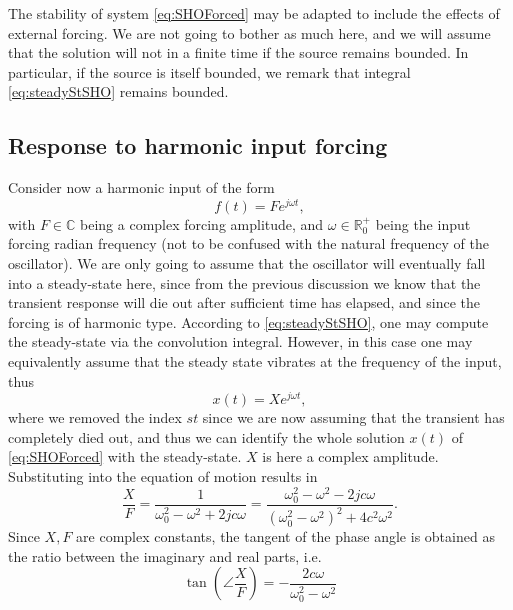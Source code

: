 The stability of system \eqref{eq:SHOForced} may be adapted to include the effects of external forcing. We are not going to bother as much here, and we will assume that the solution will not  in a finite time if the source remains bounded. 
In particular, if the source is itself bounded, we remark that integral \eqref{eq:steadyStSHO} remains bounded. 





\subsection{Response to harmonic input forcing}

Consider now a harmonic input of the form
\begin{equation}\label{eq:harmoForceLinear}
    f(t) = F e^{j\omega t},
\end{equation}
with $F \in \mathbb{C}$ being a complex forcing amplitude, and $\omega \in \mathbb{R}^+_0$ being the input forcing radian frequency (not to be confused with the natural frequency of the oscillator). We are only going to assume that the oscillator will eventually fall into a steady-state here, since from the previous discussion we know that the transient response will die out after sufficient time has elapsed, and since the forcing is of harmonic type. According to \eqref{eq:steadyStSHO}, one may compute the steady-state via the convolution integral. However, in this case one may equivalently assume that the steady state vibrates at the frequency of the input, thus
\begin{equation}
    x(t) = X e^{j\omega t},
\end{equation}
where we removed the index $st$ since we are now assuming that the transient has completely died out, and thus we can identify the whole solution $x(t)$ of \eqref{eq:SHOForced} with the steady-state. $X$ is here a complex amplitude. Substituting into the equation of motion results in
\begin{equation}\label{eq:TransXF}
    \frac{X}{F} = \frac{1}{\omega_0^2-\omega^2+2jc\omega} =  \frac{\omega_0^2-\omega^2-2jc\omega}{(\omega_0^2-\omega^2)^2+4c^2\omega^2}.
\end{equation}
Since $X,F$ are complex constants, the tangent of the phase angle  is obtained as the ratio between the imaginary and real parts, i.e. 
\begin{equation}
    \tan \left(\angle \frac{X}{F}\right) = -\frac{2c\omega}{\omega_0^2 - \omega^2}
\end{equation}
